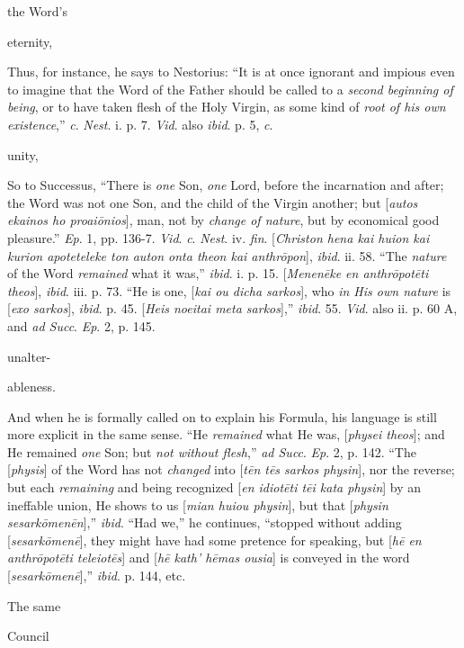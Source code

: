 the Word's

eternity,

Thus, for instance, he
says to Nestorius: ``It is at once ignorant and impious even
to imagine that the Word of the Father should be called to a \emph{second
beginning of being}, or to have taken flesh of the Holy
Virgin, as some kind of \emph{root of his own existence},'' \emph{c}.
\emph{Nest}. i. p. 7. \emph{Vid}. also \emph{ibid}. p. 5, \emph{c}.

unity,

So to Successus, ``There is \emph{one}
Son, \emph{one} Lord, before the incarnation and after; the
Word was not one Son, and the child of the Virgin another; but
[\emph{autos ekainos ho proai\={o}nios}], man, not by \emph{change
of nature}, but by economical good pleasure.'' \emph{Ep}. 1,
pp. 136-7. \emph{Vid}. \emph{c}. \emph{Nest}. iv. \emph{fin}.
[\emph{Christon hena kai huion kai kurion apoteteleke ton auton
onta theon kai anthr\={o}pon}], \emph{ibid}. ii. 58. ``The \emph{nature} of the Word \emph{remained} what it
was,'' \emph{ibid}. i. p. 15. [\emph{Menen\={e}ke en anthr\={o}pot\={e}ti
theos}], \emph{ibid}. iii. p. 73. ``He is one, [\emph{kai ou
dicha sarkos}], who \emph{in His own nature} is [\emph{exo
sarkos}], \emph{ibid}. p. 45. [\emph{Heis noeitai meta sarkos}],''
\emph{ibid}. 55. \emph{Vid}. also ii. p. 60 A, and \emph{ad Succ}.
\emph{Ep}. 2, p. 145.

unalter-

ableness.

And when he is formally called on to
explain his Formula, his language is still more explicit in
the same sense. ``He \emph{remained} what He was, [\emph{physei
theos}]; and He remained \emph{one} Son; but \emph{not without
flesh},'' \emph{ad Succ}. \emph{Ep}. 2, p. 142. ``The [\emph{physis}]
of the Word has not \emph{changed} into [\emph{t\={e}n t\={e}s
sarkos physin}], nor the reverse; but each \emph{remaining}
and being recognized [\emph{en idiot\={e}ti t\={e}i kata
physin}] by an ineffable union, He shows to us [\emph{mian
huiou physin}], but that [\emph{physin sesark\={o}men\={e}n}],''
\emph{ibid}. ``Had we,'' he continues, ``stopped without
adding [\emph{sesark\={o}men\={e}}], they might have had
some pretence for speaking, but [\emph{h\={e} en anthr\={o}pot\={e}ti
teleiot\={e}s}]
and [\emph{h\={e} kath' h\={e}mas ousia}] is
conveyed in the word [\emph{sesark\={o}men\={e}}],'' \emph{ibid}.
p. 144, etc.

The same

Council

